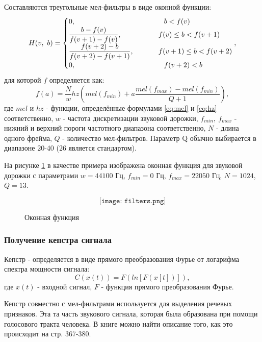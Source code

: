 Составляются треугольные мел-фильтры в виде оконной функции:
\begin{equation}
	H(v,~b)=
	\begin{cases}
		0, 										     & \Phantom \phantom{-}    b < f(v)\\
		\dfrac{b-f(v)}{f(v+1)-f(v)},   & \Phantom f(v) \leq b < f(v+1)\\
		\dfrac{f(v+2)-b}{f(v+2)-f(v+1)}, & \Phantom f(v+1) \leq b < f(v+2)\\
		0,                                           & \Phantom \phantom{-}   f(v+2) < b\\
	\end{cases}
,
\end{equation}
для которой $f$ определяется как:
\begin{equation}
	f(a)=\dfrac{N}{w} hz(mel(f_{min})+a \dfrac{mel(f_{max})-mel(f_{min})}{Q+1}),
\end{equation}
где $mel$ и $hz$ - функции, определённые формулами \eqref{eq:mel} и \eqref{eq:hz} соответственно, $w$ - частота дискретизации звуковой дорожки, $f_{min},~f_{max}$ - нижний и верхний пороги частотного диапазона соответственно, $N$ - длина одного фрейма, $Q$ - количество мел-фильтров. Параметр Q обычно выбирается в диапазоне 20-40 (26 является стандартом).

На рисунке \ref{fig:filters} в качестве примера изображена оконная функция для звуковой дорожки с параметрами $w=44100$ Гц, $f_{min}=0$ Гц, $f_{max}=22050$ Гц, $N=1024$, $Q=13$.

\begin{figure}[H]
	\[\texttt{[image: filters.png]}\]
	\caption{Оконная функция}
	\label{fig:filters}
\end{figure}

\subsubsection{Получение кепстра сигнала}
Кепстр -  определяется в виде прямого преобразования Фурье от логарифма спектра мощности сигнала:
\begin{equation}
	C(x(t))=F(ln[F(x[t])]),
\end{equation}
где $x(t)$ - входной сигнал, $F$ - функция прямого преобразования Фурье.

Кепстр совместно с мел-фильтрами используется для выделения речевых признаков. Эта та часть звукового сигнала, которая была образована при помощи голосового тракта человека. В книге \cite{CeptrumExplanation} можно найти описание того, как это происходит на стр. 367-380. 

